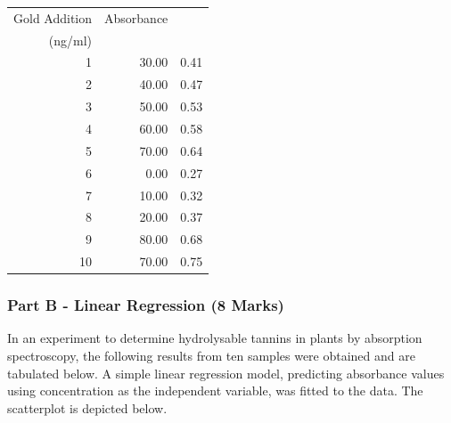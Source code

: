 \documentclass[a4paper,12pt]{article}
\begin{document}

\begin{table}[ht]
	\centering
	\begin{tabular}{rrr}
		\hline
Gold Addition   & Absorbance \\
(ng/ml)         & \\

		\hline
		1 & 30.00 & 0.41 \\ 
		2 & 40.00 & 0.47 \\ 
		3 & 50.00 & 0.53 \\ 
		4 & 60.00 & 0.58 \\ 
		5 & 70.00 & 0.64 \\ 
		6 & 0.00 & 0.27 \\ 
		7 & 10.00 & 0.32 \\ 
		8 & 20.00 & 0.37 \\ 
		9 & 80.00 & 0.68 \\ 
		10 & 70.00 & 0.75 \\ 
		\hline
	\end{tabular}
\end{table}


\subsubsection*{Part B - Linear Regression (8 Marks)}
In an experiment to determine hydrolysable tannins in plants by absorption spectroscopy, the following results from ten samples were obtained and are tabulated below. A simple linear regression model, predicting absorbance values using concentration as the independent variable, was fitted to the data. The scatterplot is depicted below.
\end{document}
